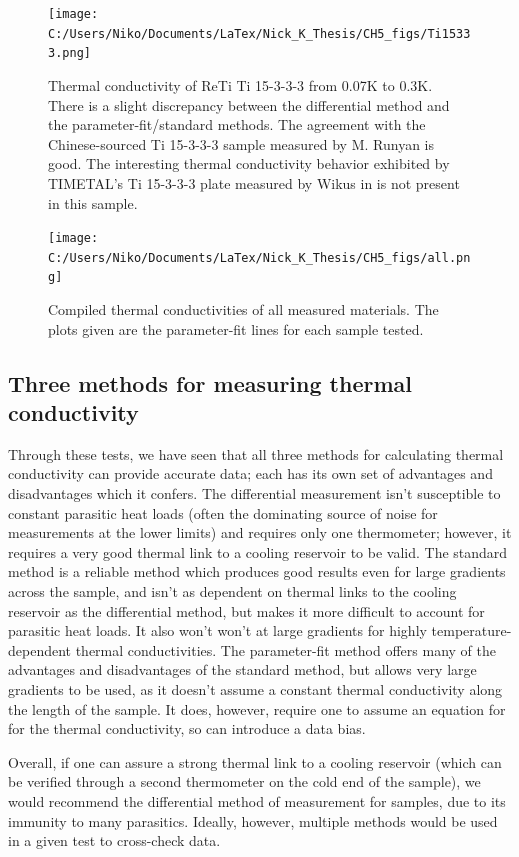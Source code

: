 \documentclass{report}
\begin{document}
\begin{figure}[h]
\centering
\texttt{[image: C:/Users/Niko/Documents/LaTex/Nick\_K\_Thesis/CH5\_figs/Ti15333.png]}
\caption{Thermal conductivity of ReTi Ti 15-3-3-3 from 0.07K to 0.3K. There is a slight discrepancy between the differential method and the parameter-fit/standard methods. The agreement with the Chinese-sourced Ti 15-3-3-3 sample measured by M. Runyan is good. The interesting thermal conductivity behavior exhibited by TIMETAL's Ti 15-3-3-3 plate measured by Wikus in \cite{wik} is not present in this sample.}
\end{figure}

\begin{figure}[h]
\centering
\texttt{[image: C:/Users/Niko/Documents/LaTex/Nick\_K\_Thesis/CH5\_figs/all.png]}
\caption{Compiled thermal conductivities of all measured materials. The plots given are the parameter-fit lines for each sample tested.}
\end{figure}

\subsection{Three methods for measuring thermal conductivity}

Through these tests, we have seen that all three methods for calculating thermal conductivity can provide accurate data; each has its own set of advantages and disadvantages which it confers. The differential measurement isn't susceptible to constant parasitic heat loads (often the dominating source of noise for measurements at the lower limits) and requires only one thermometer; however, it requires a very good thermal link to a cooling reservoir to be valid. The standard method is a reliable method which produces good results even for large gradients across the sample, and isn't as dependent on thermal links to the cooling reservoir as the differential method, but makes it more difficult to account for parasitic heat loads. It also won't won't at large gradients for highly temperature-dependent thermal conductivities. The parameter-fit method offers many of the advantages and disadvantages of the standard method, but allows very large gradients to be used, as it doesn't assume a constant thermal conductivity along the length of the sample. It does, however, require one to assume an equation for for the thermal conductivity, so can introduce a data bias.

Overall, if one can assure a strong thermal link to a cooling reservoir (which can be verified through a second thermometer on the cold end of the sample), we would recommend the differential method of measurement for samples, due to its immunity to many parasitics. Ideally, however, multiple methods would be used in a given test to cross-check data.
\end{document}
